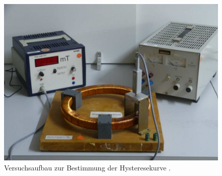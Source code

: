 \begin{figure}[H]
    \centering
    \includegraphics[]{abbildungen/toroidspule mit kern.png}
    \caption{Versuchsaufbau zur Bestimmung der Hysteresekurve \cite[]{man:v308}.}
    \label{fig:hysterese_aufbau}
\end{figure}

